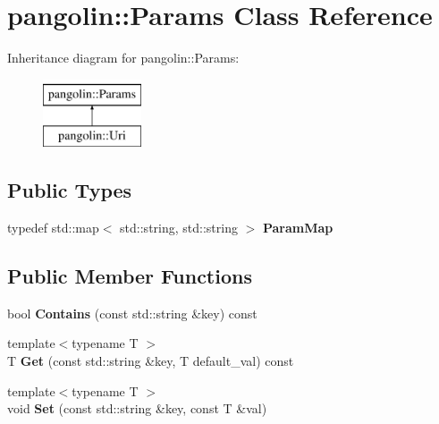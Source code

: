 \hypertarget{classpangolin_1_1_params}{}\section{pangolin\+:\+:Params Class Reference}
\label{classpangolin_1_1_params}
Inheritance diagram for pangolin\+:\+:Params\+:\begin{figure}[H]
\begin{center}
\leavevmode
\includegraphics[height=2.000000cm]{classpangolin_1_1_params}
\end{center}
\end{figure}
\subsection*{Public Types}
\begin{DoxyCompactItemize}
\item 
typedef std\+::map$<$ std\+::string, std\+::string $>$ {\bfseries Param\+Map}\hypertarget{classpangolin_1_1_params_a4f1caed253e04e835e5e3ece9d29ba48}{}\label{classpangolin_1_1_params_a4f1caed253e04e835e5e3ece9d29ba48}

\end{DoxyCompactItemize}
\subsection*{Public Member Functions}
\begin{DoxyCompactItemize}
\item 
bool {\bfseries Contains} (const std\+::string \&key) const \hypertarget{classpangolin_1_1_params_acebceaa4f09c02b7efb79147ff26c001}{}\label{classpangolin_1_1_params_acebceaa4f09c02b7efb79147ff26c001}

\item 
{\footnotesize template$<$typename T $>$ }\\T {\bfseries Get} (const std\+::string \&key, T default\+\_\+val) const \hypertarget{classpangolin_1_1_params_ad0aa5e8b0130a58a94a44dfd8b1cb7ca}{}\label{classpangolin_1_1_params_ad0aa5e8b0130a58a94a44dfd8b1cb7ca}

\item 
{\footnotesize template$<$typename T $>$ }\\void {\bfseries Set} (const std\+::string \&key, const T \&val)\hypertarget{classpangolin_1_1_params_a9278b5ab08ff14f3318c21fd35d2a967}{}\label{classpangolin_1_1_params_a9278b5ab08ff14f3318c21fd35d2a967}

\end{DoxyCompactItemize}
